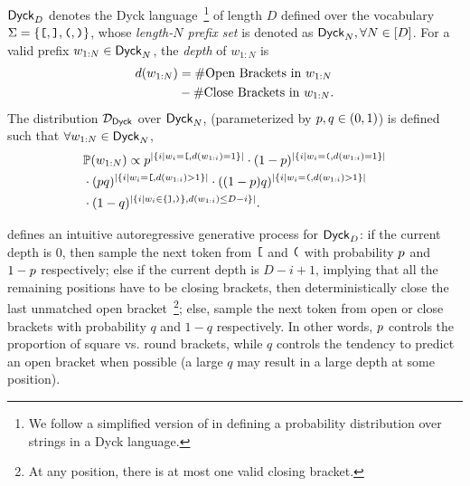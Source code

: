 \begin{definition}
\label{def:dyck}
    $\mathsf{Dyck}_D$ denotes the Dyck language~\footnote{
        We follow a simplified version of \citet{wen2023uninterpretability} in defining a probability distribution over strings in a Dyck language.
    } 
    of length $D$ defined over  
    the vocabulary $\Sigma = \{ \texttt{[}, \texttt{]}, \texttt{(}, \texttt{)} \}$,
    whose \emph{length-$N$ prefix set} is denoted as $\mathsf{Dyck}_{N}, \forall N \in [D]$.
    For a valid prefix $w_{1:N} \in \mathsf{Dyck}_{N}$, the \emph{depth} of $w_{1:N}$ is 
    \begin{align*}
        d(w_{1:N}) &= \# \text{Open Brackets in }w_{1:N} \\
        &-  \# \text{Close Brackets in }w_{1:N}.
    \end{align*}
    The distribution $\mathcal{D}_{\mathsf{Dyck}}$ over $\mathsf{Dyck}_{N}$, 
    (parameterized by $p, q \in (0,1)$)
    is defined such that $\forall w_{1:N} \in \mathsf{Dyck}_{N}$,
    \begin{align}
        \label{eq:dyck}
        &\mathbb{P}(w_{1:N})
        \propto
        p^{\left| \{i \mid w_i = \texttt{[}, d(w_{1:i}) = 1\} \right|} 
        \cdot (1 - p)^{\left| \{i \mid w_i = \texttt{(}, d(w_{1:i}) = 1\} \right|} \\
        &\cdot (p q)^{\left| \{i \mid w_i = \texttt{[}, d(w_{1:i}) > 1 \} \right|}
        \cdot ((1-p) q)^{\left| \{i \mid w_i = \texttt{(}, d(w_{1:i}) > 1 \} \right|} \\
        &\cdot (1 - q)^{\left| \{i \mid w_i \in \{ \texttt{]}, \texttt{)} \},  d(w_{1:i}) \le D - i\} \right|}.
        \notag
    \end{align}    
\end{definition}

\begin{remark}
     defines an intuitive autoregressive generative process for $\mathsf{Dyck}_D$:
    if the current depth is 0, 
    then sample the next token from $\texttt{[}$ and $\texttt{(}$ 
    with probability $p$ and $1-p$ respectively;
    else if the current depth is $D - i + 1$, 
    implying that all the remaining positions have to be closing brackets,
    then deterministically close the last unmatched open bracket~\footnote{
    \label{footnote:acc}
    At any position, there is at most one valid closing bracket.
    };
    else, sample the next token from open or close brackets with probability $q$ and $1-q$ respectively.
    In other words, $p$ controls the proportion of square vs. round brackets, while $q$ controls the tendency to predict an open bracket when possible 
    (a large $q$ may result in a large depth at some position).
\end{remark}

